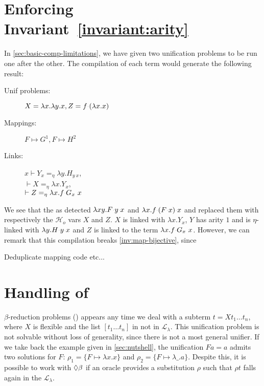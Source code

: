 \documentclass[sigconf,natbib=false,review]{acmart}
\newcommand{\appsep}{\ensuremath{\textcolor{lightgray}{\cdot}}}
\newcommand{\llambda}{\ensuremath{\mathcal{L}_\lambda}\xspace}
\newcommand{\Ho}{\ensuremath{\mathcal{H}_o}\xspace}
\newcommand{\linketaM}[3]{\ensuremath{#1 \vdash #2 =_\eta #3}}
\newcommand{\mapping}[3]{\ensuremath{#1 \mapsto #2^#3}}
\begin{document}
\section{Enforcing Invariant~\ref{invariant:arity}}
\label{sec:invariant1}

In \cref{sec:basic-comp-limitations}, we have given two unification problems to
be run one after the other. The compilation of each term would generate the
following result:

\begin{description}
  \item[Unif problems:] $X = \lambda x.\lambda y.x, Z = f\appsep(\lambda x.x)$
  \item[Mappings:] $\mapping{F}{G}{1}, \mapping{F}{H}{2}$  
  \item[Links:] $\linketaM{x}{Y_{x}}{\lambda y.H_{y~x}}$,\\
                $\linketaM{}{X}{\lambda x.Y_{x}}$,\\
                $\linketaM{}{Z}{\lambda x.f \appsep G_{x}~x}$
\end{description}

We see that the  as detected $\lambda xy.F \appsep y \appsep
x$ and $\lambda x.f\appsep (F \appsep x) \appsep x$ and replaced them with
respectively the \Ho vars $X$ and $Z$. $X$ is linked with $\lambda x.Y_x$, $Y$
has arity $1$ and is $\eta$-linked with $\lambda y.H\appsep y \appsep x$ and $Z$
is linked to the term $\lambda x.f \appsep G_{x}~x$. However, we can remark that
this compilation breaks \cref{inv:map-bijective}, since 


Deduplicate mapping code etc...
  
\section{Handling of \maybebeta}\label{sec:beta}

$\beta$-reduction problems (\maybebeta) appears any time we deal with a subterm $t
= X t_1 \dots t_n$, where $X$ is flexible and the list $[t_1 \dots t_n]$ in not
in \llambda. This unification problem is not solvable without loss of
generality, since there is not a most general unifier. If we take back the
example given in \cref{sec:nutshell}, the unification $F a = a$ admits two solutions for $F$:
$\rho_1 = \{F \mapsto \lambda x.x\}$ and $\rho_2 = \{F \mapsto \lambda \_.a\}$.
Despite this, it is possible to work with $\Diamond\beta$ if an oracle provides a
substitution $\rho$ such that $\rho t$ falls again in the \llambda.
\end{document}
